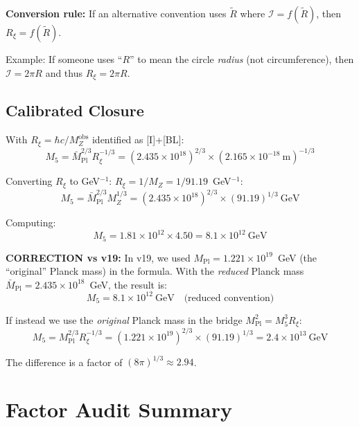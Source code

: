 \documentclass[11pt,a4paper]{article}
\newcommand{\Rxi}{R_\xi}
\newcommand{\Mpl}{M_{\mathrm{Pl}}}
\newcommand{\Mplbar}{\bar{M}_{\mathrm{Pl}}}
\newcommand{\Mfive}{M_5}
\newcommand{\calI}{\mathcal{I}}
\newcommand{\MZ}{M_Z}
\begin{document}
\textbf{Conversion rule:} If an alternative convention uses $\tilde{R}$ where
$\calI = f(\tilde{R})$, then $\Rxi = f(\tilde{R})$.

Example: If someone uses ``$R$'' to mean the circle \emph{radius} (not circumference),
then $\calI = 2\pi R$ and thus $\Rxi = 2\pi R$.

\subsection{Calibrated Closure}

With $\Rxi = \hbar c / \MZ^{\mathrm{obs}}$ identified as [I]+[BL]:
\begin{equation}
\Mfive = \Mplbar^{2/3} \Rxi^{-1/3} = (2.435 \times 10^{18})^{2/3} \times (2.165 \times 10^{-18}~\mathrm{m})^{-1/3}
\label{eq:closure-numerical}
\end{equation}

Converting $\Rxi$ to GeV$^{-1}$: $\Rxi = 1/\MZ = 1/91.19$~GeV$^{-1}$:
\begin{equation}
\Mfive = \Mplbar^{2/3} \MZ^{1/3} = (2.435 \times 10^{18})^{2/3} \times (91.19)^{1/3}~\mathrm{GeV}
\label{eq:closure-formula}
\end{equation}

Computing:
\begin{equation}
\Mfive = 1.81 \times 10^{12} \times 4.50 = 8.1 \times 10^{12}~\mathrm{GeV}
\label{eq:M5-reduced}
\end{equation}

\textbf{CORRECTION vs v19:} In v19, we used $\Mpl = 1.221 \times 10^{19}$~GeV
(the ``original'' Planck mass) in the formula. With the \emph{reduced} Planck
mass $\Mplbar = 2.435 \times 10^{18}$~GeV, the result is:
\begin{equation}
\Mfive = 8.1 \times 10^{12}~\mathrm{GeV} \quad \text{(reduced convention)}
\label{eq:M5-reduced-value}
\end{equation}

If instead we use the \emph{original} Planck mass in the bridge $\Mpl^2 = \Mfive^3\Rxi$:
\begin{equation}
\Mfive = \Mpl^{2/3} \Rxi^{-1/3} = (1.221 \times 10^{19})^{2/3} \times (91.19)^{1/3}
= 2.4 \times 10^{13}~\mathrm{GeV}
\label{eq:M5-original}
\end{equation}

The difference is a factor of $(8\pi)^{1/3} \approx 2.94$.

\section{Factor Audit Summary}
\end{document}
